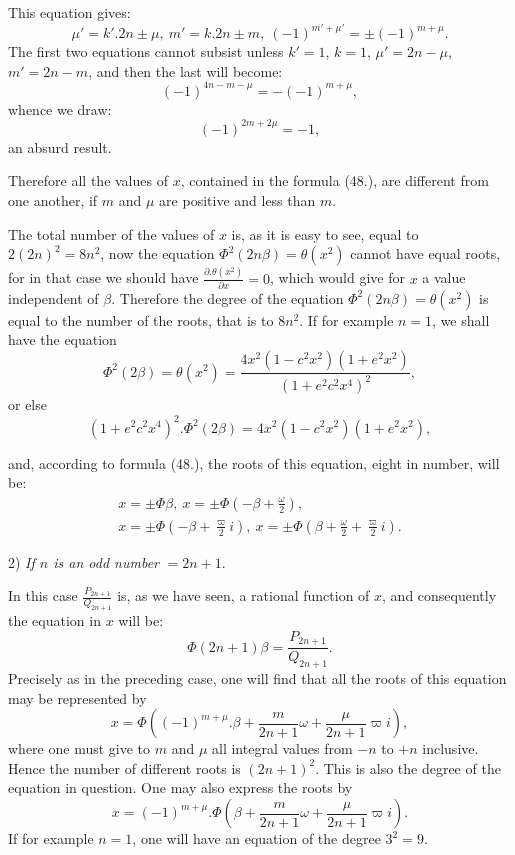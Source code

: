 \documentclass{article}
\begin{document}
This equation gives:
\[ \mu'=k'.2n\pm\mu,\ m'=k.2n\pm m,\ (-1)^{m'+\mu'}=\pm(-1)^{m+\mu}. \]
The first two equations cannot subsist unless $k'=1$, $k=1$, $\mu'=2n-\mu$, $m'=2n-m$, and then the last will become:
\[ (-1)^{4n-m-\mu}=-(-1)^{m+\mu}, \]
whence we draw:
\[ (-1)^{2m+2\mu}=-1, \]
an absurd result.

Therefore all the values of $x$, contained in the formula (48.), are different from one another, if $m$ and $\mu$ are positive and less than $m$.

The total number of the values of $x$ is, as it is easy to see, equal to $2(2n)^{2}=8n^{2}$, now the equation $\Phi^{2}(2n\beta)=\theta(x^{2})$ cannot have equal roots, for in that case we should have $\frac{\partial.\theta(x^{2})}{\partial x}=0$, which would give for $x$ a value independent of $\beta$. Therefore the degree of the equation $\Phi^{2}(2n\beta)=\theta(x^{2})$ is equal to the number of the roots, that is to $8n^{2}$. If for example $n=1$, we shall have the equation
\[ \Phi^{2}(2\beta)=\theta(x^{2})=\frac{4x^{2}(1-c^{2}x^{2})(1+e^{2}x^{2})}{(1+e^{2}c^{2}x^{4})^{2}}, \]
or else
\[ (1+e^{2}c^{2}x^{4})^{2}.\Phi^{2}(2\beta)=4x^{2}(1-c^{2}x^{2})(1+e^{2}x^{2}), \]

and, according to formula (48.), the roots of this equation, eight in number, will be:
\[ \begin{gathered} x=\pm\Phi\beta,\ x=\pm\Phi\left(-\beta+\frac{\omega}{2}\right),\\ x=\pm\Phi\left(-\beta+\frac{\varpi}{2}i\right),\ x=\pm\Phi\left(\beta+\frac{\omega}{2}+\frac{\varpi}{2}i\right). \end{gathered} \]

2) \emph{If $n$ is an odd number} $=2n+1$.

In this case $\frac{P_{2n+1}}{Q_{2n+1}}$ is, as we have seen, a rational function of $x$, and consequently the equation in $x$ will be:
\[ \Phi(2n+1)\beta=\frac{P_{2n+1}}{Q_{2n+1}}. \tag{50.} \]
Precisely as in the preceding case, one will find that all the roots of this equation may be represented by
\[ x=\Phi\left((-1)^{m+\mu}.\beta+\frac{m}{2n+1}\omega+\frac{\mu}{2n+1}\varpi i\right), \tag{51.} \]
where one must give to $m$ and $\mu$ all integral values from $-n$ to $+n$ inclusive. Hence the number of different roots is $(2n+1)^{2}$. This is also the degree of the equation in question. One may also express the roots by
\[ x=(-1)^{m+\mu}.\Phi\left(\beta+\frac{m}{2n+1}\omega+\frac{\mu}{2n+1}\varpi i\right). \]
If for example $n=1$, one will have an equation of the degree $3^{2}=9$.
\end{document}

